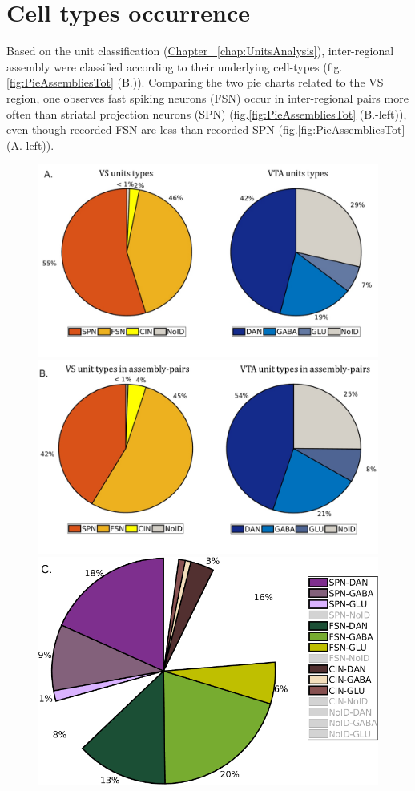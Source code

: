 \section{Cell types occurrence}
Based on the unit classification (\hyperref[chap:UnitsAnalysis]{Chapter~ \ref*{chap:UnitsAnalysis}}), inter-regional assembly were classified according to their underlying cell-types (fig.\ref{fig:PieAssembliesTot} (B.)).
Comparing the two pie charts related to the VS region, one observes fast spiking neurons (FSN) occur in inter-regional pairs more often than striatal projection neurons (SPN) (fig.\ref{fig:PieAssembliesTot} (B.-left)), even though recorded FSN are less than recorded SPN (fig.\ref{fig:PieAssembliesTot} (A.-left)).
\label{sec:CellTypesOcc}
\begin{figure}[H]
    \centering
    \includegraphics[scale=0.35]{figures/PieRegions1.pdf}
    \includegraphics[scale=0.35]{figures/PieAsNotAs.pdf}
    \includegraphics[scale=0.35]{figures/PieAssembliesTot1.png}

\end{figure}

